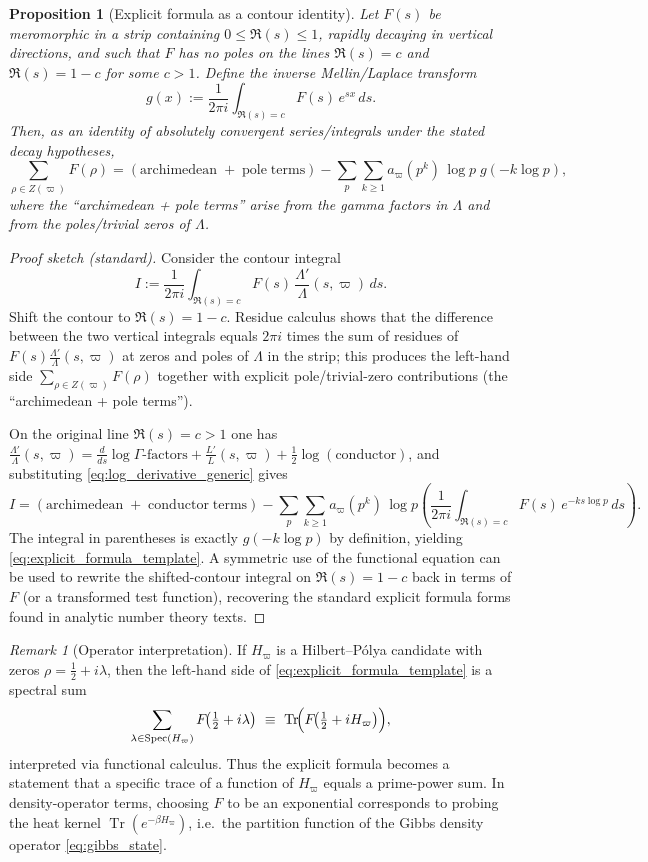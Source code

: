 \documentclass[11pt,oneside]{amsbook}
\numberwithin{equation}{section}
\theoremstyle{plain}
\newtheorem{proposition}[theorem]{Proposition}
\theoremstyle{definition}
\theoremstyle{remark}
\newtheorem{remark}[theorem]{Remark}
\DeclareMathOperator{\Spec}{\mathrm{Spec}}
\DeclareMathOperator{\Tr}{\mathrm{Tr}}
\begin{document}
\begin{proposition}[Explicit formula as a contour identity]
\label{prop:explicit_formula_contour}
Let $F(s)$ be meromorphic in a strip containing $0\le\Re(s)\le 1$, rapidly decaying in vertical directions, and such that $F$ has no poles on the lines $\Re(s)=c$ and $\Re(s)=1-c$ for some $c>1$.
Define the inverse Mellin/Laplace transform
\[
g(x):=\frac{1}{2\pi i}\int_{\Re(s)=c} F(s)\,e^{sx}\,ds.
\]
Then, as an identity of absolutely convergent series/integrals under the stated decay hypotheses,
\begin{equation}
\label{eq:explicit_formula_template}
\sum_{\rho\in Z(\varpi)} F(\rho)
=
\mathrm{(archimedean\;+\;pole\;terms)}
-\sum_{p}\sum_{k\ge 1} a_\varpi(p^k)\,\log p\; g(-k\log p),
\end{equation}
where the ``archimedean + pole terms'' arise from the gamma factors in $\Lambda$ and from the poles/trivial zeros of $\Lambda$.
\end{proposition}

\begin{proof}[Proof sketch (standard)]
Consider the contour integral
\[
I:=\frac{1}{2\pi i}\int_{\Re(s)=c} F(s)\,\frac{\Lambda'}{\Lambda}(s,\varpi)\,ds.
\]
Shift the contour to $\Re(s)=1-c$.
Residue calculus shows that the difference between the two vertical integrals equals $2\pi i$ times the sum of residues of $F(s)\frac{\Lambda'}{\Lambda}(s,\varpi)$ at zeros and poles of $\Lambda$ in the strip; this produces the left-hand side $\sum_{\rho\in Z(\varpi)}F(\rho)$ together with explicit pole/trivial-zero contributions (the ``archimedean + pole terms'').

On the original line $\Re(s)=c>1$ one has $\frac{\Lambda'}{\Lambda}(s,\varpi)=\frac{d}{ds}\log\Gamma\text{-factors}+\frac{L'}{L}(s,\varpi)+\frac{1}{2}\log(\text{conductor})$, and substituting \eqref{eq:log_derivative_generic} gives
\[
I = \mathrm{(archimedean\;+\;conductor\;terms)}
-\sum_{p}\sum_{k\ge 1} a_\varpi(p^k)\,\log p
\left(\frac{1}{2\pi i}\int_{\Re(s)=c} F(s)\,e^{-ks\log p}\,ds\right).
\]
The integral in parentheses is exactly $g(-k\log p)$ by definition, yielding \eqref{eq:explicit_formula_template}.
A symmetric use of the functional equation can be used to rewrite the shifted-contour integral on $\Re(s)=1-c$ back in terms of $F$ (or a transformed test function), recovering the standard explicit formula forms found in analytic number theory texts.
\end{proof}

\begin{remark}[Operator interpretation]
If $H_\varpi$ is a Hilbert--Pólya candidate with zeros $\rho=\tfrac12+i\lambda$, then the left-hand side of \eqref{eq:explicit_formula_template} is a spectral sum
\[
\sum_{\lambda\in\Spec(H_\varpi)} F\!\bigl(\tfrac12+i\lambda\bigr)
\ \equiv\ \Tr\!\Bigl(F\!\bigl(\tfrac12+iH_\varpi\bigr)\Bigr),
\]
interpreted via functional calculus.
Thus the explicit formula becomes a statement that a specific trace of a function of $H_\varpi$ equals a prime-power sum.
In density-operator terms, choosing $F$ to be an exponential corresponds to probing the heat kernel $\Tr(e^{-\beta H_\varpi})$, i.e.\ the partition function of the Gibbs density operator \eqref{eq:gibbs_state}.
\end{remark}
\end{document}
